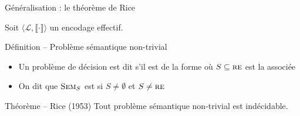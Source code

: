 
\begingroup

\begin{frame}{Généralisation : le théorème de Rice}

  Soit $\langle \mathcal{L}, \llbracket \cdot \rrbracket \rangle$ un encodage effectif. 
  \begin{block}{Définition -- Problème sémantique non-trivial}
    \begin{itemize}
    \item Un problème de décision est dit 
      s'il est de la forme
      où $S \subseteq \textsc{re}$ est la  associée
    \item On dit que $\textsc{Sem}_S$ est  si \alert{$S \neq \emptyset$} et \alert{$S \neq \textsc{re}$}
    \end{itemize}

  \end{block}
  
  \begin{block}{Théorème -- Rice (1953)}
    Tout problème sémantique non-trivial est indécidable.
  \end{block}  

\end{frame}

\endgroup
\endinput
